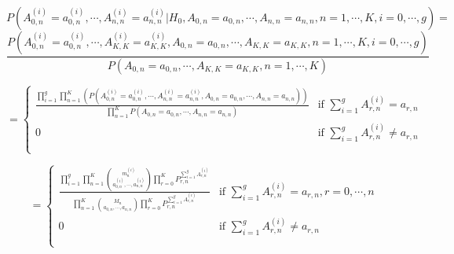 \documentclass[12pt,oneside]{report}
\theoremstyle{definition}
\theoremstyle{mystyle}
\begin{document}
\begin{equation*}
P\left(A_{0,n}^{(i)}=a_{0,n}^{(i)},\cdots,A_{n,n}^{(i)}=a_{n,n}^{(i)}|H_{0},A_{0,n}=a_{0,n},\cdots,A_{n,n}=a_{n,n},n=1,\cdots,K,i=0,\cdots,g\right)=
\end{equation*}
\begin{equation*}
\frac{P\left(A_{0,n}^{(i)}=a_{0,n}^{(i)},\cdots,A_{K,K}^{(i)}=a_{K,K}^{(i)},A_{0,n}=a_{0,n},\cdots,A_{K,K}=a_{K,K},n=1,\cdots,K,i=0,\cdots,g\right)}{P\left(A_{0,n}=a_{0,n},\cdots,A_{K,K}=a_{K,K},n=1,\cdots,K\right)}
\end{equation*}





\[ =\begin{cases}
\frac{\displaystyle\prod \limits_{i=1}^{g}\prod \limits_{n=1}^{K}\left(\displaystyle P\left(A_{0,n}^{(i)}=a_{0,n}^{(i)},\cdots,A_{n,n}^{(i)}=a_{n,n}^{(i)},A_{0,n}=a_{0,n},\cdots,A_{n,n}=a_{n,n}\right)\right)}{\displaystyle\prod \limits_{n=1}^{K}P\left(A_{0,n}=a_{0,n},\cdots,A_{n,n}=a_{n,n}\right)} &\mbox{if }  \sum \limits_{i=1}^{g}A_{r,n}^{(i)}=a_{r,n}  \\
0 & \mbox{if } \sum \limits_{i=1}^{g}A_{r,n}^{(i)} \neq a_{r,n} \\ \\
\end{cases}
\]


\[ =\begin{cases}
\frac{\displaystyle \prod\limits_{i=1}^{g}\prod\limits_{n=1}^{K}\displaystyle \binom {m^{(i)}_{n}}{a^{(i)}_{0,n},\cdots,a^{(i)}_{n,n}}\displaystyle\prod\limits_{r=0}^{K}P_{r,n}^{\sum\limits_{i=1}^{g}A_{r,n}^{(i)}}}{\displaystyle\prod\limits_{n=1}^{K}\displaystyle \binom {M_{n}}{a_{0,n},\cdots,a_{n,n}}\displaystyle\prod\limits_{r=0}^{K}P_{r,n}^{\sum\limits_{i=1}^{g}A_{r,n}^{(i)}}}&\mbox{if }  \sum \limits_{i=1}^{g}A_{r,n}^{(i)}=a_{r,n},r=0,\cdots,n  \\
0 & \mbox{if } \sum \limits_{i=1}^{g}A_{r,n}^{(i)} \neq a_{r,n} \\ \\
\end{cases}
\]
\end{document}
